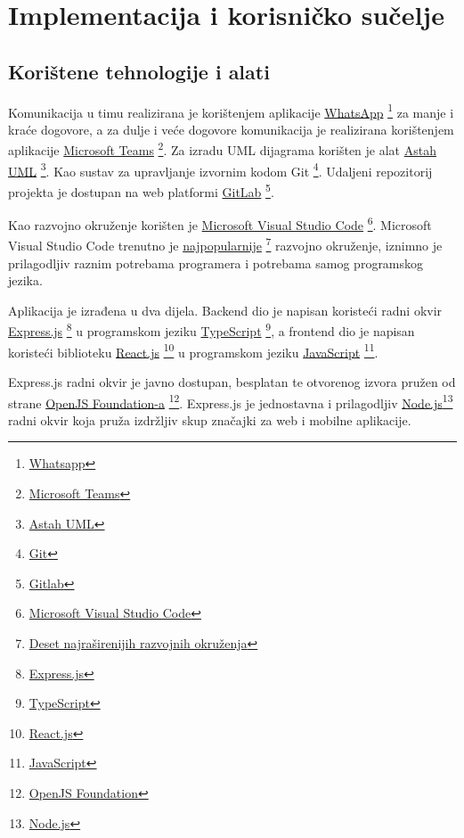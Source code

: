 \chapter{Implementacija i korisničko sučelje}

		
		\section{Korištene tehnologije i alati}
		
			Komunikacija u timu realizirana je korištenjem aplikacije \underline{WhatsApp} \footnote{\href{https://www.whatsapp.com/}{Whatsapp}} za manje i kraće dogovore, a za dulje i veće dogovore komunikacija je realizirana korištenjem aplikacije \underline{Microsoft Teams} \footnote{\href{https://www.microsoft.com/hr-hr/microsoft-365/microsoft-teams/group-chat-software}{Microsoft Teams}}. Za izradu UML dijagrama korišten je alat \underline{Astah UML} \footnote{\href{https://astah.net/products/astah-uml/}{Astah UML}}. Kao sustav za upravljanje izvornim kodom Git \footnote{\href{https://git-scm.com/}{Git}}. Udaljeni repozitorij projekta je dostupan na web platformi \underline{GitLab} \footnote{\href{https://www.gitlab.com}{Gitlab}}.

			Kao razvojno okruženje korišten je \underline{Microsoft Visual Studio Code} \footnote{\href{https://code.visualstudio.com/}{Microsoft Visual Studio Code}}. Microsoft Visual Studio Code trenutno je \underline{najpopularnije} \footnote{\href{https://pypl.github.io/IDE.html}{Deset najraširenijih razvojnih okruženja}} razvojno okruženje, iznimno je prilagodljiv raznim potrebama programera i potrebama samog programskog jezika.
			
			Aplikacija je izrađena u dva dijela. Backend dio je napisan koristeći radni okvir \underline{Express.js} \footnote{\href{https://expressjs.com/}{Express.js}} u programskom jeziku \underline{TypeScript} \footnote{\href{https://www.typescriptlang.org/}{TypeScript}}, a frontend dio je napisan koristeći biblioteku \underline{React.js} \footnote{\href{https://reactjs.org/}{React.js}} u programskom jeziku \underline{JavaScript} \footnote{\href{https://www.javascript.com/}{JavaScript}}.
			
			Express.js radni okvir je javno dostupan, besplatan te otvorenog izvora pružen od strane \underline{OpenJS Foundation-a} \footnote{\href{https://openjsf.org/}{OpenJS Foundation}}. Express.js je jednostavna i prilagodljiv \underline{Node.js}\footnote{\href{https://nodejs.org/en/}{Node.js}} radni okvir koja pruža izdržljiv skup značajki za web i mobilne aplikacije.
			
